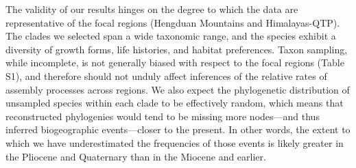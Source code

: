 The validity of our results hinges on the degree to which the data are representative of the focal regions (Hengduan Mountains and Himalayas-QTP). The clades we selected span a wide taxonomic range, and the species exhibit a diversity of growth forms, life histories, and habitat preferences. Taxon sampling, while incomplete, is not generally biased with respect to the focal regions (Table S1), and therefore should not unduly affect inferences of the relative rates of assembly processes across regions. We also expect the phylogenetic distribution of unsampled species within each clade to be effectively random, which means that reconstructed phylogenies would tend to be missing more nodes---and thus inferred biogeographic events---closer to the present. In other words, the extent to which we have underestimated the frequencies of those events is likely greater in the Pliocene and Quaternary than in the Miocene and earlier.










